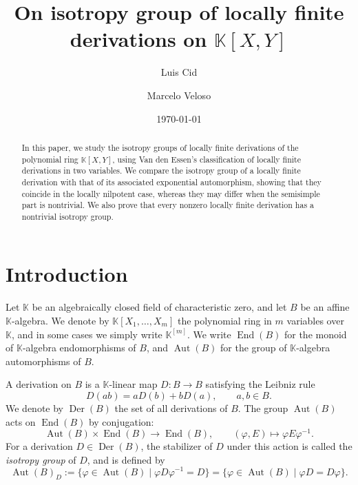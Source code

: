 \documentclass[11pt,a4paper,reqno]{amsart}
\begin{document}
\title{On isotropy group of  locally finite derivations on $\mathbb{K}[X,Y]$}


\author{Luis Cid}
\address{Instituto de Matem\'atica y F\'\i sica, Universidad de Talca,
  Casilla 721, Talca, Chile.}%


\author{Marcelo Veloso} 
\address{Departamento de Fisíca Estatística e Matemática, Universidade Federal de S\~ao Jo\~ao del-Rei, Brasil}



\date{\today}



\begin{abstract}
In this paper, we study the isotropy groups of locally finite derivations of the polynomial ring $\mathbb{K}[X,Y]$, using Van den Essen's classification of locally finite derivations in two variables. We compare the isotropy group of a locally finite derivation with that of its associated exponential automorphism, showing that they coincide in the locally nilpotent case, whereas they may differ when the semisimple part is nontrivial. We also prove that every nonzero locally finite derivation has a nontrivial isotropy group.
\end{abstract}

\maketitle



\section{Introduction}

Let $\mathbb{K}$ be an algebraically closed field of characteristic zero, and let $B$ be an affine $\mathbb{K}$-algebra. We denote by $\mathbb{K}[X_1,\ldots,X_m]$ the polynomial ring in $m$ variables over $\mathbb{K}$, and in some cases we simply write $\mathbb{K}^{[m]}$. We write $\operatorname{End}(B)$ for the monoid of $\mathbb{K}$-algebra endomorphisms of $B$, and $\operatorname{Aut}(B)$ for the group of $\mathbb{K}$-algebra automorphisms of $B$.

A derivation on $B$ is a $\mathbb{K}$-linear map $D\colon B\to B$ satisfying the Leibniz rule
\[
D(ab)=aD(b)+bD(a), \qquad a,b\in B.
\]
We denote by $\operatorname{Der}(B)$ the set of all derivations of $B$. The group $\operatorname{Aut}(B)$ acts on $\operatorname{End}(B)$ by conjugation:
\[
\operatorname{Aut}(B)\times \operatorname{End}(B)\to \operatorname{End}(B),\qquad
(\varphi,E)\mapsto \varphi E\varphi^{-1}.
\]
For a derivation $D\in \operatorname{Der}(B)$, the stabilizer of $D$ under this action is called the \emph{isotropy group} of $D$, and is defined by
\[
\operatorname{Aut}(B)_D
:=
\{\varphi\in \operatorname{Aut}(B)\mid \varphi D\varphi^{-1}=D\}
=
\{\varphi\in \operatorname{Aut}(B)\mid \varphi D=D\varphi\}.
\]
\end{document}
